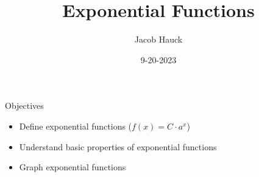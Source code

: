 \documentclass[]{beamer}
\title{Exponential Functions}
\author{Jacob Hauck}
\institute{Math 6010}
\date{9-20-2023}
\begin{document}
	\beamertemplatenavigationsymbolsempty
	
	\frame{\titlepage}
	
%		
	
	\begin{frame}{Objectives}
		\begin{itemize}
			\item Define exponential functions ($f(x) = C\cdot a^x$)
			\pause\vfill
			\item Understand basic properties of exponential functions
			\pause\vfill
			\item Graph exponential functions
		\end{itemize}
	\end{frame}
	
\end{document}
